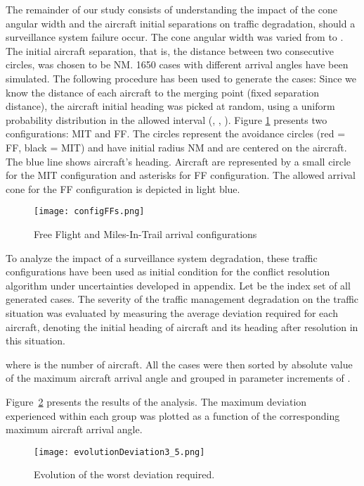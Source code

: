 \documentclass[a4paper, 10pt]{IEEEtran}
\begin{document}
The remainder of our study consists of understanding the impact of the cone angular width and the aircraft initial separations on traffic degradation, should a surveillance system failure occur.
The cone angular width was varied from  to . 
The initial aircraft separation, that is, the distance between two consecutive circles, was chosen to be NM. 1650 cases with different arrival angles have been simulated. The following procedure has been used to generate the cases: Since we know the distance of each aircraft to the merging point (fixed separation distance), the aircraft initial heading was picked at random, using a uniform probability distribution in the allowed interval (, , ). Figure \ref{fig:aircraftOnCircles} presents two configurations: MIT and FF. The circles represent the avoidance circles (red = FF, black = MIT) and have initial radius NM and are centered on the aircraft. The blue line shows aircraft's heading. Aircraft are represented by a small circle for the MIT configuration and asterisks for FF configuration. The allowed arrival cone for the FF configuration is depicted in light blue.
 


\begin{figure}[ht]
\centering
    \texttt{[image: configFFs.png]}
    \caption{Free Flight and Miles-In-Trail arrival configurations}
    \label{fig:aircraftOnCircles}
\end{figure}


To analyze the impact of a surveillance system degradation, these traffic configurations have
been used as initial condition for the conflict resolution algorithm under uncertainties developed in appendix. Let  be the index set of all generated cases. The severity of the traffic management degradation on the traffic situation 
was evaluated by measuring the average deviation  required for each aircraft, denoting  the initial heading of aircraft  and  its heading after resolution in this situation. 

where  is the number of aircraft. All the cases were then sorted by absolute value of the maximum aircraft arrival angle and grouped in parameter increments of . 




Figure~\ref{fig:EvolutionDeviation3.5} presents the results of the analysis. The maximum deviation  experienced within each group was plotted as a function of the corresponding maximum aircraft arrival angle.

\begin{figure}[ht]
\centering
    \texttt{[image: evolutionDeviation3\_5.png]}
    \caption{Evolution of the worst deviation required.}
    \label{fig:EvolutionDeviation3.5}
\end{figure}
\end{document}
